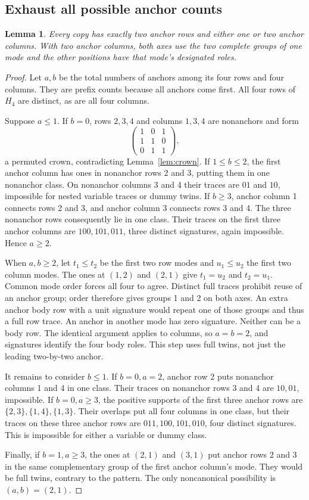 \documentclass[11pt,a4paper]{article}
\newtheorem{lemma}[theorem]{Lemma}
\theoremstyle{remark}
\newcommand{\Hfour}{H_4}
\begin{document}
\subsection{Exhaust all possible anchor counts}
\begin{lemma}\label{lem:shape}
Every copy has exactly two anchor rows and either one or two anchor
columns. With two anchor columns, both axes use the two complete groups
of one mode and the other positions have that mode's designated roles.
\end{lemma}
\begin{proof}
Let \(a,b\) be the total numbers of anchors among its four rows and four
columns. They are prefix counts because all anchors come first.
All four rows of \(\Hfour\) are distinct, as are all four columns.

Suppose \(a\le1\). If \(b=0\), rows \(2,3,4\) and columns \(1,3,4\)
are nonanchors and form
\[
\begin{pmatrix}1&0&1\\1&1&0\\0&1&1\end{pmatrix},
\]
a permuted crown, contradicting Lemma~\ref{lem:crown}. If
\(1\le b\le2\), the first anchor column has ones in nonanchor rows
2 and 3, putting them in one nonanchor class. On nonanchor columns
3 and 4 their traces are \(01\) and \(10\), impossible for nested
variable traces or dummy twins. If \(b\ge3\), anchor column 1 connects
rows 2 and 3, and anchor column 3 connects rows 3 and 4. The three
nonanchor rows consequently lie in one class. Their traces on the
first three anchor columns are \(100,101,011\), three distinct
signatures, again impossible. Hence \(a\ge2\).

When \(a,b\ge2\), let \(t_1\le t_2\) be the first two row modes and
\(u_1\le u_2\) the first two column modes. The ones at \((1,2)\)
and \((2,1)\) give \(t_1=u_2\) and \(t_2=u_1\). Common mode
order forces all four to agree. Distinct full traces prohibit reuse
of an anchor group; order therefore gives groups 1 and 2 on both
axes. An extra anchor body row with a unit signature would repeat
one of those groups and thus a full row trace. An anchor in another
mode has zero signature. Neither can be a body row. The identical
argument applies to columns, so \(a=b=2\), and signatures identify
the four body roles. This step uses full twins, not just the leading
two-by-two anchor.

It remains to consider \(b\le1\). If \(b=0,a=2\), anchor row 2 puts
nonanchor columns 1 and 4 in one class. Their traces on nonanchor
rows 3 and 4 are \(10,01\), impossible. If \(b=0,a\ge3\), the
positive supports of the first three anchor rows are
\(\{2,3\},\{1,4\},\{1,3\}\). Their overlaps put all four columns
in one class, but their traces on these three anchor rows are
\(011,100,101,010\), four distinct signatures. This is impossible
for either a variable or dummy class.

Finally, if \(b=1,a\ge3\), the ones at \((2,1)\) and \((3,1)\)
put anchor rows 2 and 3 in the same complementary group of the first
anchor column's mode. They would be full twins, contrary to the
pattern. The only noncanonical possibility is \((a,b)=(2,1)\).
\end{proof}
\end{document}
